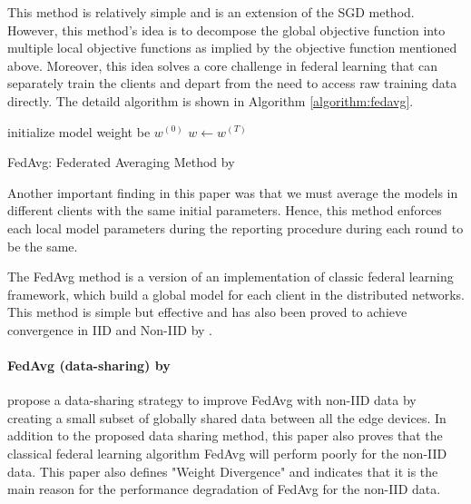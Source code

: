\documentclass[a4paper,12pt,authoryear]{elegantpaper}
\begin{document}
This method is relatively simple and is an extension of the SGD method. However, this method's idea is to decompose the global objective function into multiple local objective functions as implied by the objective function mentioned above. Moreover, this idea solves a core challenge in federal learning that can separately train the clients and depart from the need to access raw training data directly. The detaild algorithm is shown in Algorithm \ref{algorithm:fedavg}.

\begin{algorithm}
    initialize model weight be $w^{(0)}$\;
    $w\leftarrow w^{(T)}$\;
    \caption{FedAvg: Federated Averaging Method by \cite{mcmahan_communication-efficient_2017}}\label{algorithm:fedavg}
\end{algorithm}

Another important finding in this paper was that we must average the models in different clients with the same initial parameters. Hence, this method enforces each local model parameters during the reporting procedure during each round to be the same.

The FedAvg method is a version of an implementation of classic federal learning framework, which build a global model for each client in the distributed networks. This method is simple but effective and has also been proved to achieve convergence in IID and Non-IID by \cite{li_convergence_2020}.

\paragraph{FedAvg (data-sharing) by \cite{zhao_federated_2018}}

\cite{zhao_federated_2018} propose a data-sharing strategy to improve FedAvg with non-IID data by creating a small subset of globally shared data between all the edge devices. In addition to the proposed data sharing method, this paper also proves that the classical federal learning algorithm FedAvg will perform poorly for the non-IID data. This paper also defines "Weight Divergence" and indicates that it is the main reason for the performance degradation of FedAvg for the non-IID data.
\end{document}
